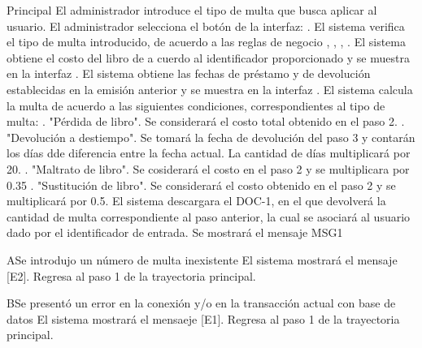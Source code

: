 \begin{UCtrayectoria}{Principal}
	\UCpaso[\UCactor] El administrador introduce el tipo de multa que busca aplicar al usuario.
	\UCpaso[\UCactor] El administrador selecciona el botón  de la interfaz: . 
	\UCpaso[\UCsist]  El sistema verifica el tipo de multa introducido, de acuerdo a las reglas de negocio , , , .
	\UCpaso[\UCsist] El sistema obtiene el costo del libro de a cuerdo al identificador proporcionado y se muestra en la interfaz . 
	\UCpaso[\UCsist] El sistema obtiene las fechas de préstamo y de devolución establecidas en la emisión anterior y se muestra en la interfaz . 
	\UCpaso[\UCsist] El sistema calcula la multa de acuerdo a las siguientes condiciones, correspondientes al tipo de multa: . "Pérdida de libro". Se considerará el costo total obtenido en el paso 2. . "Devolución a destiempo". Se tomará la fecha de devolución del paso 3 y contarán los días dde diferencia entre la fecha actual. La cantidad de días multiplicará por 20. . "Maltrato de libro". Se cosiderará el costo en el paso 2 y se multiplicara por 0.35 . "Sustitución de libro". Se considerará el costo obtenido en el paso 2 y se multiplicará por 0.5.
	\UCpaso[\UCsist] El sistema descargara el DOC-1, en el que devolverá la cantidad de multa correspondiente al paso anterior, la cual se asociará al usuario dado por el identificador de entrada.  
	\UCpaso[\UCsist] Se mostrará el mensaje MSG1
\end{UCtrayectoria}
\begin{UCtrayectoriaA}{A}{Se introdujo un número de multa inexistente}	
			\UCpaso[\UCsist] El sistema mostrará el mensaje [E2].
			\UCpaso[\UCsist] Regresa al paso 1 de la trayectoria principal. 
\end{UCtrayectoriaA}
\begin{UCtrayectoriaA}{B}{Se presentó un error en la conexión y/o en la transacción actual con base de datos}
			\UCpaso[\UCsist] El sistema mostrará el mensaeje [E1].
			\UCpaso[\UCsist] Regresa al paso 1 de la trayectoria principal.
\end{UCtrayectoriaA}
